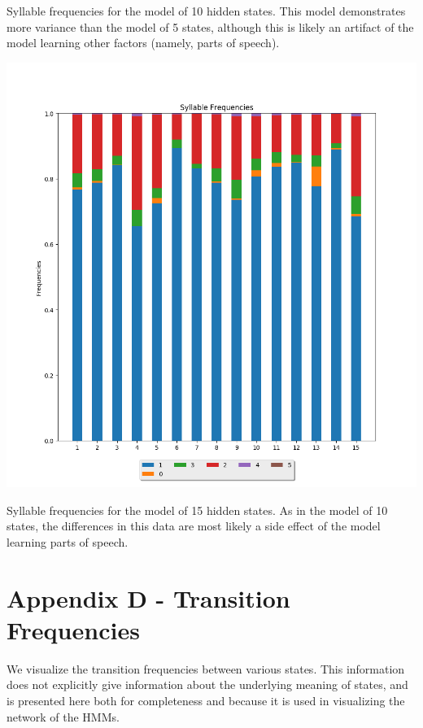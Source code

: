 Syllable frequencies for the model of 10 hidden states. This model demonstrates more variance than the model of 5 states, although this is likely an artifact of the model learning other factors (namely, parts of speech).

\begin{center}
\includegraphics[scale=0.6]{../src/results/syllables_15}
\end{center}

Syllable frequencies for the model of 15 hidden states. As in the model of 10 states, the differences in this data are most likely a side effect of the model learning parts of speech.

\pagebreak
\section{Appendix D - Transition Frequencies}
We visualize the transition frequencies between various states. This information does not explicitly give information about the underlying meaning of states, and is presented here both for completeness and because it is used in visualizing the network of the HMMs.

